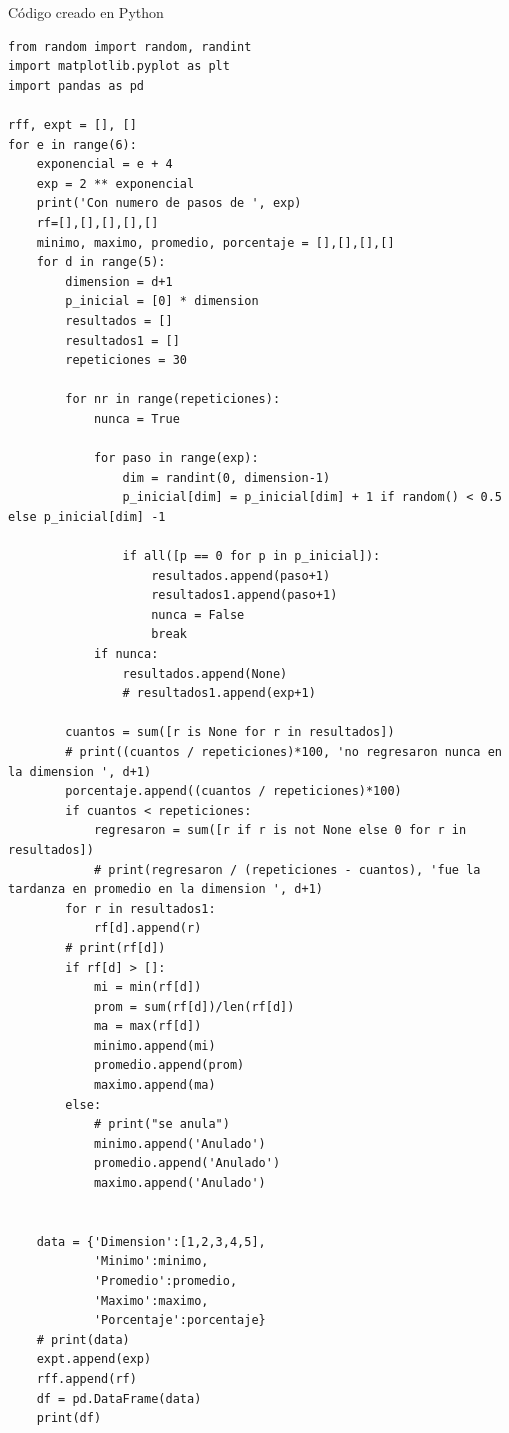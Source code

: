 \documentclass{article}
\begin{document}
Código creado en Python\\
\begin{verbatim}
from random import random, randint
import matplotlib.pyplot as plt 
import pandas as pd

rff, expt = [], []
for e in range(6):
    exponencial = e + 4
    exp = 2 ** exponencial
    print('Con numero de pasos de ', exp)
    rf=[],[],[],[],[]
    minimo, maximo, promedio, porcentaje = [],[],[],[]
    for d in range(5):
        dimension = d+1
        p_inicial = [0] * dimension
        resultados = []
        resultados1 = []
        repeticiones = 30
    
        for nr in range(repeticiones):
            nunca = True
    
            for paso in range(exp):
                dim = randint(0, dimension-1)
                p_inicial[dim] = p_inicial[dim] + 1 if random() < 0.5 else p_inicial[dim] -1
                
                if all([p == 0 for p in p_inicial]):
                    resultados.append(paso+1)
                    resultados1.append(paso+1)
                    nunca = False
                    break
            if nunca:
                resultados.append(None)
                # resultados1.append(exp+1)
        
        cuantos = sum([r is None for r in resultados])
        # print((cuantos / repeticiones)*100, 'no regresaron nunca en la dimension ', d+1)
        porcentaje.append((cuantos / repeticiones)*100)
        if cuantos < repeticiones:
            regresaron = sum([r if r is not None else 0 for r in resultados])
            # print(regresaron / (repeticiones - cuantos), 'fue la tardanza en promedio en la dimension ', d+1)
        for r in resultados1:
            rf[d].append(r) 
        # print(rf[d])
        if rf[d] > []:
            mi = min(rf[d])
            prom = sum(rf[d])/len(rf[d])
            ma = max(rf[d])
            minimo.append(mi)
            promedio.append(prom)
            maximo.append(ma)
        else:
            # print("se anula")
            minimo.append('Anulado')
            promedio.append('Anulado')
            maximo.append('Anulado')
        
            
    data = {'Dimension':[1,2,3,4,5], 
            'Minimo':minimo, 
            'Promedio':promedio, 
            'Maximo':maximo,
            'Porcentaje':porcentaje} 
    # print(data)
    expt.append(exp)
    rff.append(rf)
    df = pd.DataFrame(data)
    print(df)
        

\end{verbatim}
\end{document}
